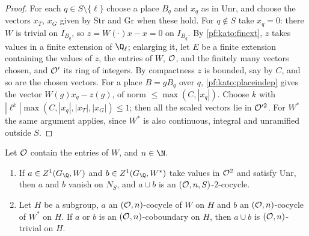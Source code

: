 \begin{proof}
For each $q\in S\setminus\{\ell\}$ choose a place $B_q$ and $x_q$ as in $\mathrm{Unr}$, and choose the vectors $x_T$, $x_G$
given by $\mathrm{Str}$ and $\mathrm{Gr}$ when these hold. For $q\notin S$ take $x_q=0$: there $W$ is trivial on $I_{B_q}$,
so $z=W(\cdot)x-x=0$ on $I_{B_q}$. By \cref{pf:kato:finext}, $z$ takes values in a finite extension of
$\Q_\ell$; enlarging it, let $E$ be a finite extension containing the values of
$z$, the entries of $W$, $\mathcal{O}$, and the finitely many vectors chosen, and $\mathcal{O}'$ its ring of integers. By
compactness $z$ is bounded, say by $C$, and so are the chosen vectors. For a place $B=gB_q$ over $q$, \cref{pf:kato:placeindep}
gives the vector $W(g)x_q-z(g)$, of norm $\le\max(C,|x_q|)$. Choose $k$ with $|\ell^k|\max(C,|x_q|,|x_T|,|x_G|)\le1$; then
all the scaled vectors lie in $\mathcal{O}'^2$. For $W^*$ the same argument applies, since $W^*$ is also continuous,
integral and unramified outside $S$.
\end{proof}

\begin{lemma}\label{pf:kato:cup}
Let $\mathcal{O}$ contain the entries of $W$, and $n\in\N$.
\begin{enumerate}[label=(\alph*)]
\item If $a\in\katoZ(G_\Q,W)$ and $b\in\katoZ(G_\Q,W^*)$ take values in $\mathcal{O}^2$ and satisfy $\mathrm{Unr}$, then $a$ and
  $b$ vanish on $N_S$, and $a\cup b$ is an $(\mathcal{O},n,S)$-$2$-cocycle.
\item Let $H$ be a subgroup, $a$ an $(\mathcal{O},n)$-cocycle of $W$ on $H$ and $b$ an $(\mathcal{O},n)$-cocycle of $W^*$ on $H$. If $a$
  or $b$ is an $(\mathcal{O},n)$-coboundary on $H$, then $a\cup b$ is $(\mathcal{O},n)$-trivial on $H$.
\end{enumerate}
\end{lemma}

